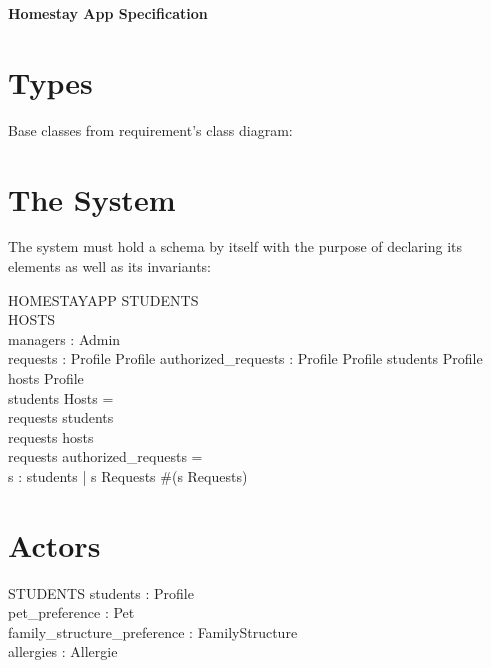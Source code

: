 \documentclass[11pt]{article}
\begin{document}
\begin{center}\LARGE
	\textbf{Homestay App Specification}
\end{center}

\section*{Types}
Base classes from requirement's class diagram:
\begin{zed}
\end{zed}


\section*{The System}
The system must hold a schema by itself with the purpose of declaring its elements as well as its invariants:
\begin{schema}{HOMESTAYAPP}
	\Xi STUDENTS\\
	\Xi HOSTS\\
	managers : \power Admin\\
	requests : Profile \rightarrow Profile
	authorized_requests : Profile \rightarrow Profile
\where
	students \subseteq Profile\\
	hosts \subseteq Profile\\
	students \cap Hosts = \emptyset\\
	\dom requests \subset students\\
	\ran requests \subset hosts\\
	requests \cap authorized_requests = \emptyset\\
	\forall s : students | s \in \dom Requests \bullet \#(s \dres Requests) 
\end{schema}


\section*{Actors}
\begin{schema}{STUDENTS}
	students : \power Profile\\
	pet\_preference : Pet \rightarrow \nat\\
	family\_structure\_preference : \nat \rightarrow FamilyStructure\\
	allergies : \power Allergie\\
\where

\end{schema}
\end{document}

